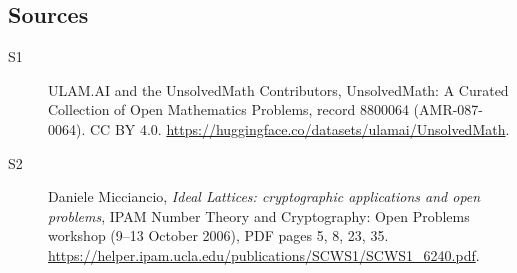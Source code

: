 \documentclass[11pt]{article}
\begin{document}
\subsection{Sources}
\begin{description}
\item[\hypertarget{source:8800064:1}{S1}] ULAM.AI and the UnsolvedMath Contributors, UnsolvedMath: A Curated Collection of Open Mathematics Problems, record 8800064 (AMR-087-0064). CC BY 4.0. \url{https://huggingface.co/datasets/ulamai/UnsolvedMath}.
\item[\hypertarget{source:8800064:2}{S2}] Daniele Micciancio, \emph{Ideal Lattices: cryptographic applications and open problems}, IPAM Number Theory and Cryptography: Open Problems workshop (9--13 October 2006), PDF pages 5, 8, 23, 35. \url{https://helper.ipam.ucla.edu/publications/SCWS1/SCWS1_6240.pdf}.
\end{description}
\label{end:8800064}
\end{document}
